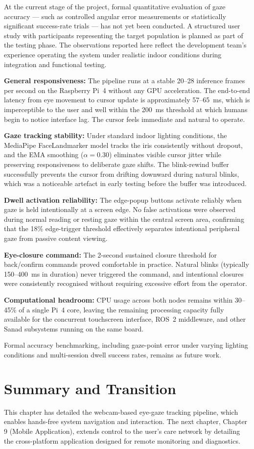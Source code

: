 At the current stage of the project, formal quantitative evaluation of gaze accuracy — such
as controlled angular error measurements or statistically significant success-rate trials —
has not yet been conducted. A structured user study with participants representing the target
population is planned as part of the testing phase. The observations
reported here reflect the development team's experience operating the system under realistic
indoor conditions during integration and functional testing.

\textbf{General responsiveness:} The pipeline runs at a stable 20--28 inference frames per
second on the Raspberry Pi~4 without any GPU acceleration. The end-to-end latency from eye
movement to cursor update is approximately 57--65~ms, which is imperceptible to the user
and well within the 200~ms threshold at which humans begin to notice interface lag.
The cursor feels immediate and natural to operate.

\textbf{Gaze tracking stability:} Under standard indoor lighting conditions, the
MediaPipe FaceLandmarker model tracks the iris consistently without dropout, and the EMA
smoothing ($\alpha = 0.30$) eliminates visible cursor jitter while preserving
responsiveness to deliberate gaze shifts. The blink-rewind buffer successfully prevents the
cursor from drifting downward during natural blinks, which was a noticeable artefact in
early testing before the buffer was introduced.

\textbf{Dwell activation reliability:} The edge-popup buttons activate reliably when gaze
is held intentionally at a screen edge. No false activations were observed during normal
reading or resting gaze within the central screen area, confirming that the 18\% edge-trigger
threshold effectively separates intentional peripheral gaze from passive content viewing.

\textbf{Eye-closure command:} The 2-second sustained closure threshold for back/confirm
commands proved comfortable in practice. Natural blinks (typically 150--400~ms in
duration) never triggered the command, and intentional closures were
consistently recognised without requiring excessive effort from the operator.

\textbf{Computational headroom:} CPU usage across both nodes remains within 30--45\% of a
single Pi~4 core, leaving the remaining processing capacity fully available for the
concurrent touchscreen interface, ROS~2 middleware, and other Sanad subsystems running on
the same board.

Formal accuracy benchmarking, including gaze-point error under varying lighting conditions and multi-session dwell success rates, remains as future work.

\section{Summary and Transition}
This chapter has detailed the webcam-based eye-gaze tracking pipeline, which enables hands-free system navigation and interaction. The next chapter, Chapter 9 (Mobile Application), extends control to the user's care network by detailing the cross-platform application designed for remote monitoring and diagnostics.

